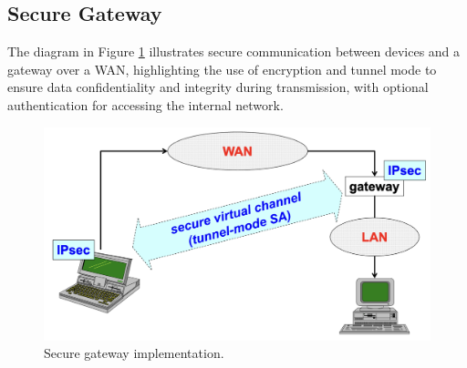 \subsection{Secure Gateway}
The diagram in Figure \ref{fig:secgat} illustrates secure communication between devices and a gateway over a WAN, highlighting the use of encryption and tunnel mode to ensure data confidentiality and integrity during transmission, with optional authentication for accessing the internal network.
\begin{figure}[H]
  \includegraphics[width=\linewidth]{Images/NetSec/secure_gateway.png}
  \caption{Secure gateway implementation.}
  \label{fig:secgat}
\end{figure}